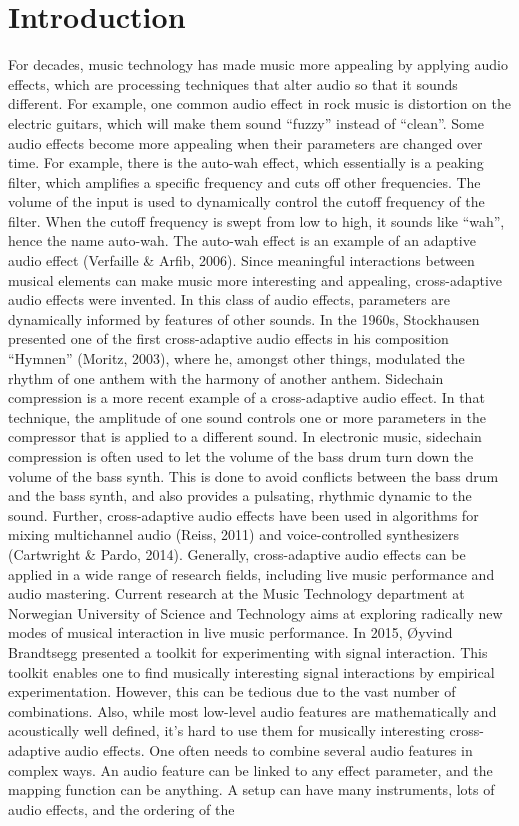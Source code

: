 \chapter{Introduction}
For decades, music technology has made music more appealing by applying audio effects, which are processing techniques that alter audio so that it sounds different. For example, one common audio effect in rock music is distortion on the electric guitars, which will make them sound “fuzzy” instead of “clean”. Some audio effects become more appealing when their parameters are changed over time. For example, there is the auto-wah effect, which essentially is a peaking filter, which amplifies a specific frequency and cuts off other frequencies. The volume of the input is used to dynamically control the cutoff frequency of the filter. When the cutoff frequency is swept from low to high, it sounds like “wah”, hence the name auto-wah. The auto-wah effect is an example of an adaptive audio effect (Verfaille \& Arfib, 2006). Since meaningful interactions between musical elements can make music more interesting and appealing, cross-adaptive audio effects were invented. In this class of audio effects, parameters are dynamically informed by features of other sounds. In the 1960s, Stockhausen presented one of the first cross-adaptive audio effects in his composition “Hymnen” (Moritz, 2003), where he, amongst other things, modulated the rhythm of one anthem with the harmony of another anthem. Sidechain compression is a more recent example of a cross-adaptive audio effect. In that technique, the amplitude of one sound controls one or more parameters in the compressor that is applied to a different sound. In electronic music, sidechain compression is often used to let the volume of the bass drum turn down the volume of the bass synth. This is done to avoid conflicts between the bass drum and the bass synth, and also provides a pulsating, rhythmic dynamic to the sound. Further, cross-adaptive audio effects have been used in algorithms for mixing multichannel audio (Reiss, 2011) and voice-controlled synthesizers (Cartwright \& Pardo, 2014). Generally, cross-adaptive audio effects can be applied in a wide range of research fields, including live music performance and audio mastering. Current research at the Music Technology department at Norwegian University of Science and Technology aims at exploring radically new modes of musical interaction in live music performance. In 2015, Øyvind Brandtsegg presented a toolkit for experimenting with signal interaction. This toolkit enables one to find musically interesting signal interactions by empirical experimentation. However, this can be tedious due to the vast number of combinations. Also, while most low-level audio features are mathematically and acoustically well defined, it’s hard to use them for musically interesting cross-adaptive audio effects. One often needs to combine several audio features in complex ways. An audio feature can be linked to any effect parameter, and the mapping function can be anything. A setup can have many instruments, lots of audio effects, and the ordering of the 